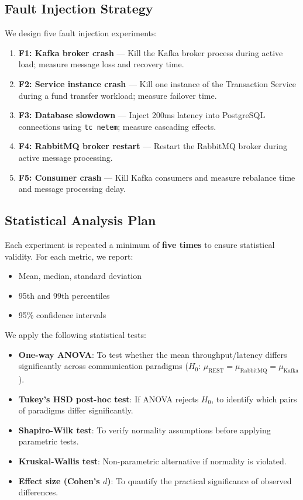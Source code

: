 \documentclass[journal]{IEEEtran}
\begin{document}
\subsection{Fault Injection Strategy}
\label{subsec:fault_injection}

We design five fault injection experiments:

\begin{enumerate}
    \item \textbf{F1: Kafka broker crash} --- Kill the Kafka broker process during active load; measure message loss and recovery time.
    \item \textbf{F2: Service instance crash} --- Kill one instance of the Transaction Service during a fund transfer workload; measure failover time.
    \item \textbf{F3: Database slowdown} --- Inject 200ms latency into PostgreSQL connections using \texttt{tc netem}; measure cascading effects.
    \item \textbf{F4: RabbitMQ broker restart} --- Restart the RabbitMQ broker during active message processing.
    \item \textbf{F5: Consumer crash} --- Kill Kafka consumers and measure rebalance time and message processing delay.
\end{enumerate}

\subsection{Statistical Analysis Plan}
\label{subsec:statistical_plan}

Each experiment is repeated a minimum of \textbf{five times} to ensure statistical validity. For each metric, we report:

\begin{itemize}
    \item Mean, median, standard deviation
    \item 95th and 99th percentiles
    \item 95\% confidence intervals
\end{itemize}

We apply the following statistical tests:

\begin{itemize}
    \item \textbf{One-way ANOVA}: To test whether the mean throughput/latency differs significantly across communication paradigms ($H_0$: $\mu_{\text{REST}} = \mu_{\text{RabbitMQ}} = \mu_{\text{Kafka}}$).
    \item \textbf{Tukey's HSD post-hoc test}: If ANOVA rejects $H_0$, to identify which pairs of paradigms differ significantly.
    \item \textbf{Shapiro-Wilk test}: To verify normality assumptions before applying parametric tests.
    \item \textbf{Kruskal-Wallis test}: Non-parametric alternative if normality is violated.
    \item \textbf{Effect size (Cohen's $d$)}: To quantify the practical significance of observed differences.
\end{itemize}
\end{document}
